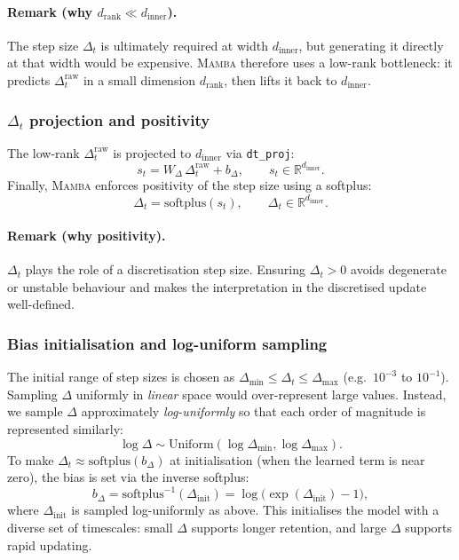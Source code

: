 \documentclass[a4paper,11pt]{article}
\begin{document}
\paragraph{Remark (why $d_{\text{rank}} \ll d_{\text{inner}}$).}
The step size $\Delta_t$ is ultimately required at width $d_{\text{inner}}$, but generating it directly at that width would be expensive.
\textsc{Mamba} therefore uses a low-rank bottleneck: it predicts $\Delta^{\text{raw}}_t$ in a small dimension $d_{\text{rank}}$, then lifts it back to $d_{\text{inner}}$.

\subsubsection{$\Delta_t$ projection and positivity}
\label{app:mamba-dt}

The low-rank $\Delta^{\text{raw}}_t$ is projected to $d_{\text{inner}}$ via \texttt{dt\_proj}:
\begin{equation}
    s_t = W_{\Delta}\,\Delta^{\text{raw}}_t + b_{\Delta},
    \qquad
    s_t \in \mathbb{R}^{d_{\text{inner}}}.
    \label{eq:dt_proj}
\end{equation}
Finally, \textsc{Mamba} enforces positivity of the step size using a softplus:
\begin{equation}
    \Delta_t = \mathrm{softplus}(s_t),
    \qquad
    \Delta_t \in \mathbb{R}^{d_{\text{inner}}}.
    \label{eq:dt_softplus}
\end{equation}

\paragraph{Remark (why positivity).}
$\Delta_t$ plays the role of a discretisation step size. Ensuring $\Delta_t>0$ avoids degenerate or unstable behaviour and makes the interpretation in the discretised update well-defined.

\subsubsection{Bias initialisation and log-uniform sampling}
\label{app:mamba-bias-init}

The initial range of step sizes is chosen as $\Delta_{\min} \le \Delta_t \le \Delta_{\max}$ (e.g.\ $10^{-3}$ to $10^{-1}$). 
Sampling $\Delta$ uniformly in \emph{linear} space would over-represent large values.
Instead, we sample $\Delta$ approximately \emph{log-uniformly} so that each order of magnitude is represented similarly:
\[
\log \Delta \sim \mathrm{Uniform}(\log \Delta_{\min}, \log \Delta_{\max}).
\]
To make $\Delta_t \approx \mathrm{softplus}(b_{\Delta})$ at initialisation (when the learned term is near zero), the bias is set via the inverse softplus:
\begin{equation}
    b_{\Delta} = \mathrm{softplus}^{-1}(\Delta_{\text{init}})
    = \log\!\big(\exp(\Delta_{\text{init}})-1\big),
    \label{eq:bias_init}
\end{equation}
where $\Delta_{\text{init}}$ is sampled log-uniformly as above.
This initialises the model with a diverse set of timescales: small $\Delta$ supports longer retention, and large $\Delta$ supports rapid updating.
\end{document}
